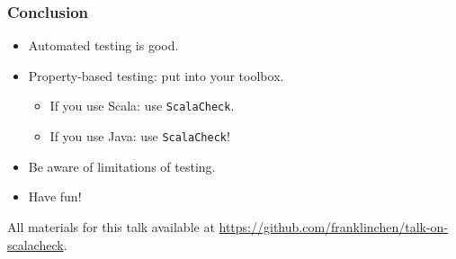 \begin{frame}
  \frametitle{Conclusion}

  \begin{itemize}
    \item Automated testing is good.
    \item Property-based testing: put into your toolbox.
      \begin{itemize}
        \item If you use Scala: use \texttt{ScalaCheck}.
        \item If you use Java: use \texttt{ScalaCheck}!
      \end{itemize}
    \item Be aware of limitations of testing.
    \item Have fun!
  \end{itemize}

  All materials for this talk available at \url{https://github.com/franklinchen/talk-on-scalacheck}.

\end{frame}


